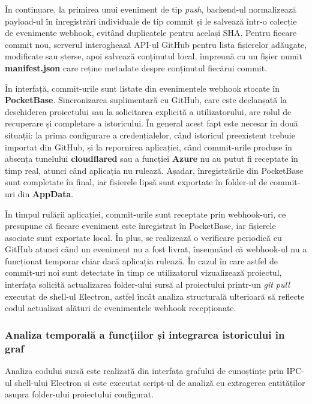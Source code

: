 \documentclass[12pt]{article}
\numberwithin{equation}{section}
\numberwithin{figure}{section}
\numberwithin{table}{section}
\theoremstyle{definition}
\theoremstyle{plain}
\begin{document}
În continuare, la primirea unui eveniment de tip \textit{push}, backend-ul normalizează payload-ul în înregistrări individuale de tip commit și le salvează într-o colecție de evenimente webhook, evitând duplicatele pentru același SHA. Pentru fiecare commit nou, serverul interoghează API-ul GitHub pentru lista fișierelor adăugate, modificate sau șterse, apoi salvează conținutul local, împreună cu un fișier numit \textbf{manifest.json} care reține metadate despre conținutul fiecărui commit.

În interfață, commit-urile sunt listate din evenimentele webhook stocate în \textbf{PocketBase}. Sincronizarea suplimentară cu GitHub, care este declanșată la deschiderea proiectului sau la solicitarea explicită a utilizatorului, are rolul de recuperare și completare a istoricului. În general acest fapt este necesar în două situații: la prima configurare a credențialelor, când istoricul preexistent trebuie importat din GitHub, și la repornirea aplicației, când commit-urile produse în absența tunelului \textbf{cloudflared} sau a funcției \textbf{Azure} nu au putut fi receptate în timp real, atunci când aplicația nu rulează. Așadar, înregistrările din PocketBase sunt completate în final, iar fișierele lipsă sunt exportate în folder-ul de commit-uri din \textbf{AppData}.

În timpul rulării aplicației, commit-urile sunt receptate prin webhook-uri, ce presupune că fiecare eveniment este înregistrat în PocketBase, iar fișierele asociate sunt exportate local. În plus, se realizează o verificare periodică cu GitHub atunci când un eveniment nu a fost livrat, însemnând că webhook-ul nu a funcționat temporar chiar dacă aplicația rulează. În cazul în care astfel de commit-uri noi sunt detectate în timp ce utilizatorul vizualizează proiectul, interfața solicită actualizarea folder-ului sursă al proiectului printr-un \textit{git pull} executat de shell-ul Electron, astfel încât analiza structurală ulterioară să reflecte codul actualizat alături de evenimentele webhook recepționate.

\subsubsection{Analiza temporală a funcțiilor și integrarea istoricului în graf}

Analiza codului sursă este realizată din interfața grafului de cunoștințe prin IPC-ul shell-ului Electron și este executat script-ul de analiză cu extragerea entităților asupra folder-ului proiectului configurat.
\end{document}
